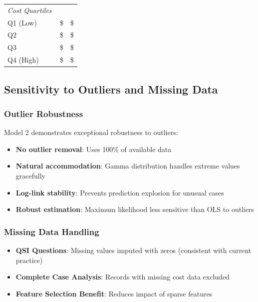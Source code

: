 \begin{table}[h]
\begin{tabular}{lrrrr}
\midrule
\multicolumn{5}{l}{\textit{Cost Quartiles}} \\
Q1 (Low) & \ModelTwoSubgroupcostQOneLowN{} & \ModelTwoSubgroupcostQOneLowRSquared{} & \$\ModelTwoSubgroupcostQOneLowRMSE{} & \$\ModelTwoSubgroupcostQOneLowBias{} \\
Q2 & \ModelTwoSubgroupcostQTwoN{} & \ModelTwoSubgroupcostQTwoRSquared{} & \$\ModelTwoSubgroupcostQTwoRMSE{} & \$\ModelTwoSubgroupcostQTwoBias{} \\
Q3 & \ModelTwoSubgroupcostQThreeN{} & \ModelTwoSubgroupcostQThreeRSquared{} & \$\ModelTwoSubgroupcostQThreeRMSE{} & \$\ModelTwoSubgroupcostQThreeBias{} \\
Q4 (High) & \ModelTwoSubgroupcostQFourHighN{} & \ModelTwoSubgroupcostQFourHighRSquared{} & \$\ModelTwoSubgroupcostQFourHighRMSE{} & \$\ModelTwoSubgroupcostQFourHighBias{} \\
\bottomrule
\end{tabular}
\end{table}

\subsection{Sensitivity to Outliers and Missing Data}

\subsubsection{Outlier Robustness}

Model 2 demonstrates exceptional robustness to outliers:
\begin{itemize}
    \item \textbf{No outlier removal}: Uses 100\% of available data
    \item \textbf{Natural accommodation}: Gamma distribution handles extreme values gracefully
    \item \textbf{Log-link stability}: Prevents prediction explosion for unusual cases
    \item \textbf{Robust estimation}: Maximum likelihood less sensitive than OLS to outliers
\end{itemize}

\subsubsection{Missing Data Handling}
\begin{itemize}
    \item \textbf{QSI Questions}: Missing values imputed with zeros (consistent with current practice)
    \item \textbf{Complete Case Analysis}: Records with missing cost data excluded
    \item \textbf{Feature Selection Benefit}: Reduces impact of sparse features
\end{itemize}

